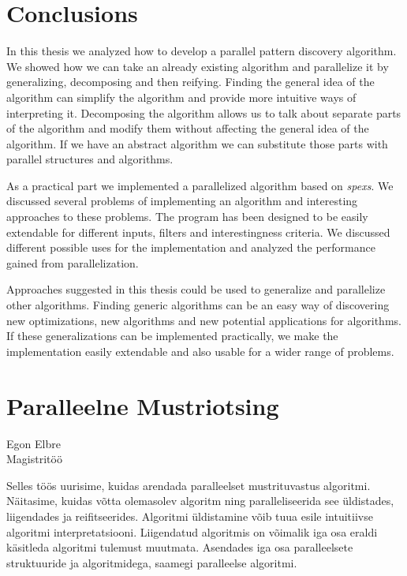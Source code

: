 \chapter{Conclusions}
\label{c:conclusions}

In this thesis we analyzed how to develop a parallel pattern discovery algorithm. We showed how we can take an already existing algorithm and parallelize it by generalizing, decomposing and then reifying. Finding the general idea of the algorithm can simplify the algorithm and provide more intuitive ways of interpreting it. Decomposing the algorithm allows us to talk about separate parts of the algorithm and modify them without affecting the general idea of the algorithm. If we have an abstract algorithm we can substitute those parts with parallel structures and algorithms.

As a practical part we implemented a parallelized algorithm based on \emph{spexs}\cite{spexs}. We discussed several problems of implementing an algorithm and interesting approaches to these problems. The program has been designed to be easily extendable for different inputs, filters and interestingness criteria. We discussed different possible uses for the implementation and analyzed the performance gained from parallelization.

Approaches suggested in this thesis could be used to generalize and parallelize other algorithms. Finding generic algorithms can be an easy way of discovering new optimizations, new algorithms and new potential applications for algorithms. If these generalizations can be implemented practically, we make the implementation easily extendable and also usable for a wider range of problems.

\chapter*{Paralleelne Mustriotsing}
\label{c:kokkuvote}

\begin{flushleft}
  {\large Egon Elbre } \\[2mm]
  {\large Magistritöö } \\[6mm]
\end{flushleft}

Selles töös uurisime, kuidas arendada paralleelset mustrituvastus algoritmi. Näitasime, kuidas võtta olemasolev algoritm ning paralleliseerida see üldistades, liigendades ja reifitseerides. Algoritmi üldistamine võib tuua esile intuitiivse algoritmi interpretatsiooni. Liigendatud algoritmis on võimalik iga osa eraldi käsitleda algoritmi tulemust muutmata. Asendades iga osa paralleelsete struktuuride ja algoritmidega, saamegi paralleelse algoritmi.

